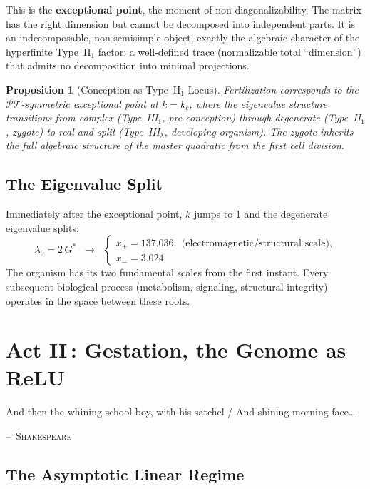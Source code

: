 \documentclass[12pt, letterpaper]{article}
\theoremstyle{plain}
\newtheorem{proposition}[theorem]{Proposition}
\theoremstyle{definition}
\theoremstyle{remark}
\newcommand{\Gstar}{{G^{*}}}              %
\begin{document}
This is the \textbf{exceptional point}, the moment of non-diagonalizability. The matrix has the right dimension but cannot be decomposed into independent parts. It is an indecomposable, non-semisimple object, exactly the algebraic character of the hyperfinite Type~II$_1$ factor: a well-defined trace (normalizable total ``dimension'') that admits no decomposition into minimal projections.

\begin{proposition}[Conception as Type~II$_1$ Locus]\label{prop:conception}
  Fertilization corresponds to the $\mathcal{PT}$-symmetric exceptional point at $k = k_c$, where the eigenvalue structure transitions from complex (Type~III$_1$, pre-conception) through degenerate (Type~II$_1$, zygote) to real and split (Type~III$_\lambda$, developing organism). The zygote inherits the full algebraic structure of the master quadratic from the first cell division.
\end{proposition}

\subsection{The Eigenvalue Split}

Immediately after the exceptional point, $k$ jumps to 1 and the degenerate eigenvalue splits:
\begin{equation}\label{eq:split}
  \lambda_0 = 2\,\Gstar \;\;\longrightarrow\;\;
  \begin{cases}
    x_+ = 137.036 & \text{(electromagnetic/structural scale)}, \\
    x_- = 3.024.
  \end{cases}
\end{equation}
The organism has its two fundamental scales from the first instant. Every subsequent biological process (metabolism, signaling, structural integrity) operates in the space between these roots.


\section{\texorpdfstring{Act II\,: Gestation, the Genome as ReLU}{Act II: Gestation, the Genome as ReLU}}
\label{sec:act2}

\epigraph{And then the whining school-boy, with his satchel / And shining morning face\ldots}{\textsc{--~Shakespeare}}

\subsection{The Asymptotic Linear Regime}
\end{document}
